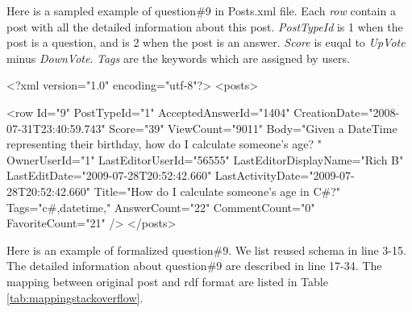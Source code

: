 \clearpage
Here is a sampled example of question\#9 in Posts.xml file. Each \textit{row} contain a post with all the detailed information about this post. \textit{PostTypeId} is 1 when the post is a question, and is 2 when the post is an answer. \textit{Score} is euqal to \textit{UpVote} minus \textit{DownVote}. \textit{Tags} are the keywords which are assigned by users.
\begin{algorithm}%
\begin{algorithmic}[1]
\State <?xml version="1.0" encoding="utf-8"?>
\State <posts>

\State \indent <row Id="9" PostTypeId="1" AcceptedAnswerId="1404" CreationDate="2008-07-31T23:40:59.743" Score="39" ViewCount="9011" Body="Given a DateTime representing their birthday, how do I calculate someone's age?  " OwnerUserId="1" LastEditorUserId="56555" LastEditorDisplayName="Rich B" LastEditDate="2009-07-28T20:52:42.660" LastActivityDate="2009-07-28T20:52:42.660" Title="How do I calculate someone's age in C\#?" Tags="c\#,datetime," AnswerCount="22" CommentCount="0" FavoriteCount="21" />
\State </posts>

\end{algorithmic}
\end{algorithm}

Here is an example of formalized question\#9. We list reused schema in line 3-15. The detailed information about question\#9 are described in line 17-34. The mapping between original post and rdf format are listed in Table \ref{tab:mappingstackoverflow}.



